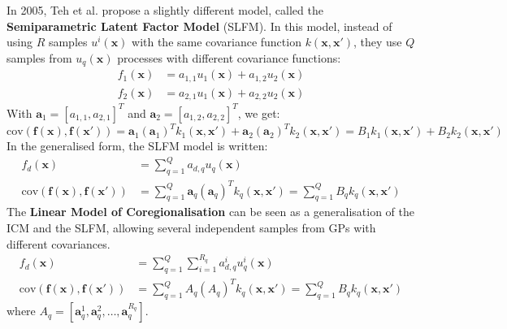 \documentclass[a4paper,12pt]{article}
\begin{document}
In 2005, Teh et al. \cite{Teh2005} propose a slightly different model, called the \textbf{Semiparametric Latent Factor Model} (SLFM). In this model, instead of using $R$ samples $u^i(\mathbf{x})$ with the same covariance function $k(\mathbf{x}, \mathbf{x'})$, they use $Q$ samples from $u_q(\mathbf{x})$ processes with different covariance functions:
\begin{equation}
\begin{aligned}
  f_1(\mathbf{x}) &= a_{1,1} u_1(\mathbf{x}) + a_{1,2} u_2(\mathbf{x})\\
  f_2(\mathbf{x}) &= a_{2,1} u_1(\mathbf{x}) + a_{2,2} u_2(\mathbf{x})
\end{aligned}
\end{equation}
With $\mathbf{a}_1 = [a_{1,1}, a_{2,1}]^T$ and $\mathbf{a}_2 = [a_{1,2}, a_{2,2}]^T$, we get:
\begin{equation}
    \text{cov}(\mathbf{f}(\mathbf{x}), \mathbf{f}(\mathbf{x'})) = \mathbf{a}_1 (\mathbf{a}_1)^T k_1(\mathbf{x}, \mathbf{x'}) + \mathbf{a}_2 (\mathbf{a}_2)^T k_2(\mathbf{x}, \mathbf{x'}) = B_1 k_1(\mathbf{x}, \mathbf{x'}) + B_2 k_2(\mathbf{x}, \mathbf{x'})
\end{equation}
In the generalised form, the SLFM model is written:
\begin{equation}
\begin{aligned}
  f_d(\mathbf{x}) &= \sum_{q = 1}^{Q} a_{d,q} u_q(\mathbf{x}) \\
  \text{cov}(\mathbf{f}(\mathbf{x}), \mathbf{f}(\mathbf{x'})) &= \sum_{q = 1}^Q \mathbf{a}_q (\mathbf{a}_q)^T k_q(\mathbf{x}, \mathbf{x'}) = \sum_{q = 1}^Q B_q k_q(\mathbf{x}, \mathbf{x'})
\end{aligned}
\end{equation}
\newline
The \textbf{Linear Model of Coregionalisation} can be seen as a generalisation of the ICM and the SLFM, allowing several independent samples from GPs with different covariances.
\begin{equation}
\label{LMC_eq}
\begin{aligned}
  f_d(\mathbf{x}) &= \sum_{q = 1}^{Q} \sum_{i = 1}^{R_q} a^i_{d,q} u^i_q(\mathbf{x}) \\
  \text{cov}(\mathbf{f}(\mathbf{x}), \mathbf{f}(\mathbf{x'})) &= \sum_{q = 1}^Q A_q (A_q)^T k_q(\mathbf{x}, \mathbf{x'}) = \sum_{q = 1}^Q B_q k_q(\mathbf{x}, \mathbf{x'})
\end{aligned}
\end{equation}
where $A_q = [\mathbf{a}^1_q, \mathbf{a}^2_q, \dots, \mathbf{a}^{R_q}_q]$.\\
\end{document}
